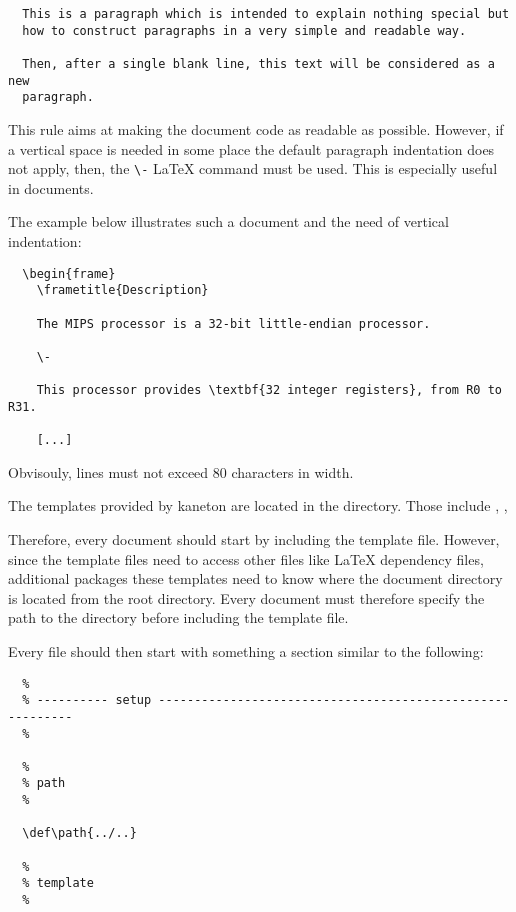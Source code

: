 \begin{verbatim}
  This is a paragraph which is intended to explain nothing special but
  how to construct paragraphs in a very simple and readable way.

  Then, after a single blank line, this text will be considered as a new
  paragraph.
\end{verbatim}

This rule aims at making the document code as readable as possible. However,
if a vertical space is needed in some place the default paragraph indentation
does not apply, then, the \verb|\-| {\LaTeX} command must be used. This is
especially useful in  documents.

The example below illustrates such a  document and the
need of vertical indentation:

\begin{verbatim}
  \begin{frame}
    \frametitle{Description}

    The MIPS processor is a 32-bit little-endian processor.

    \-

    This processor provides \textbf{32 integer registers}, from R0 to R31.

    [...]
\end{verbatim}

Obvisouly, lines must not exceed $80$ characters in width.

The templates provided by kaneton are located in the 
directory. Those include , ,  \etc{}

Therefore, every document should start by including the template file.
However, since the template files need to access other files like
{\LaTeX} dependency files, additional packages \etc{} these templates need to
know where the document directory is located from the root 
directory. Every document must therefore specify the path to the
 directory before including the template file.

Every file should then start with something a  section similar
to the following:

\begin{verbatim}
  %
  % ---------- setup ----------------------------------------------------------
  %

  %
  % path
  %

  \def\path{../..}

  %
  % template
  %

  
\end{verbatim}

